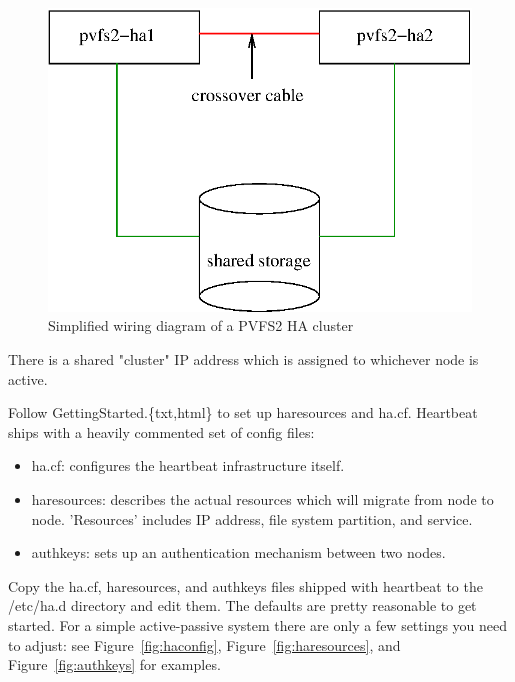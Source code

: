\documentclass[11pt]{article}
\begin{document}
\begin{figure}
\begin{center}
\includegraphics[scale=0.75]{pvfs2-failover.eps}
\end{center}
\caption{Simplified wiring diagram of a PVFS2 HA cluster}
\label{fig:nodes}
\end{figure}

There is a shared "cluster" IP address which is assigned to whichever
node is active. 

Follow GettingStarted.\{txt,html\} to set up haresources and ha.cf.
Heartbeat ships with a heavily commented set of config files:
\begin{itemize}
\item ha.cf: configures the heartbeat infrastructure itself.
\item haresources: describes the actual resources which will migrate
  from node to node.  'Resources' includes IP address, file system
  partition, and service. 
\item authkeys: sets up an authentication mechanism between two nodes.
\end{itemize}

Copy the ha.cf, haresources, and authkeys files shipped with heartbeat
to the /etc/ha.d directory and edit them. The defaults are pretty
reasonable to get started.  For a simple active-passive system
there are only a few settings you need to adjust: see
Figure~\ref{fig:haconfig}, Figure~\ref{fig:haresources}, and
Figure~\ref{fig:authkeys} for examples.
\end{document}
